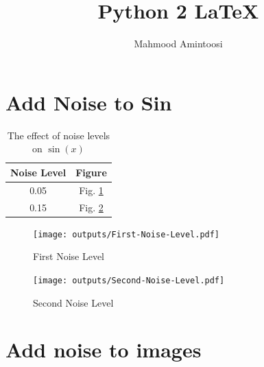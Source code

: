 \documentclass{article}%
\title{Python 2 LaTeX}%
\author{Mahmood Amintoosi}%
\date{}%
\begin{document}
%
\normalsize%
\maketitle%
\section{Add Noise to Sin}%
\label{sec:AddNoisetoSin}%


\begin{table}[ht]%
\begin{center}%
\caption{The effect of noise levels on $\sin(x)$}%
\begin{tabular}{|c|c|}%
\hline%
Noise Level&Figure\\%
\hline%
0.05&Fig. \ref{fig:param0}\\%
\hline%
0.15&Fig. \ref{fig:param1}\\%
\hline%
\end{tabular}%
\end{center}%
\end{table}

%


\begin{figure}[H]%
\centering%
\texttt{[image: outputs/First-Noise-Level.pdf]}%
\caption{First Noise Level}%
\label{fig:param0}%
\end{figure}

%


\begin{figure}[H]%
\centering%
\texttt{[image: outputs/Second-Noise-Level.pdf]}%
\caption{Second Noise Level}%
\label{fig:param1}%
\end{figure}

%
\section{Add noise to images}%
\label{sec:Addnoisetoimages}%
\end{document}
